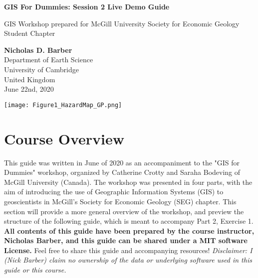 \documentclass{article}
\begin{document}
\begin{titlepage}
   \begin{center}
       \vspace*{1cm}

       \LARGE
       \textbf{GIS For Dummies: Session 2 Live Demo Guide}
       
       \Large
       \vspace{0.3cm}
        GIS Workshop prepared for McGill University Society for Economic Geology Student Chapter
            
       \vspace{1.2cm}
       \textbf{Nicholas D. Barber}\\
       Department of Earth Science\\
       University of Cambridge\\
       United Kingdom\\
       June 22nd, 2020
            
       \vspace{0.8cm}
     
       \texttt{[image: Figure1\_HazardMap\_GP.png]}
   \end{center}
\end{titlepage}

\tableofcontents

\section{Course Overview}

This guide was written in June of 2020 as an accompaniment to the "GIS for Dummies" workshop, organized by Catherine Crotty and Saraha Bodeving of McGill University (Canada). The workshop was presented in four parts, with the aim of introducing the use of Geographic Information Systems (GIS) to geoscientists in McGill's Society for Economic Geology (SEG) chapter. This section will provide a more general overview of the workshop, and preview the structure of the following guide, which is meant to accompany Part 2, Exercise 1. \textbf{All contents of this guide have been prepared by the course instructor, Nicholas Barber, and this guide can be shared under a MIT software License.} Feel free to share this guide and accompanying resources! \textit{Disclaimer: I (Nick Barber) claim no ownership of the data or underlying software used in this guide or this course.} 
\end{document}

